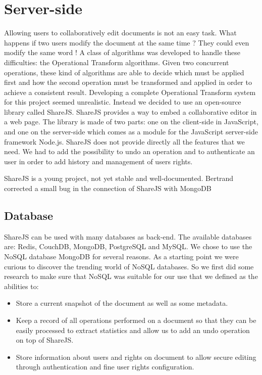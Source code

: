 \documentclass{llncs}
\begin{document}
\section{Server-side}\label{sec:Server-side}

Allowing users to collaboratively edit documents is not an easy task.
What happens if two users modify the document at the same time ?
They could even modify the same word ! A class of algorithms was developed to handle these difficulties:
the Operational Transform algorithms. Given two concurrent operations, these kind
of algorithms are able to decide which must be applied first and how the second
operation must be transformed and applied in order to achieve a consistent result.
Developing a complete Operational Transform system for this project seemed unrealistic.
Instead we decided to use an open-source library called ShareJS. 
ShareJS provides a way to embed a collaborative editor in a web page.
The library is made of two parts: one on the client-side in JavaScript, 
and one on the server-side which comes as a module for the JavaScript server-side framework
Node.js.
ShareJS does not provide directly all the features that we need. 
We had to add the possibility to undo an operation and to authenticate an user in order to add
history and management of users rights.

ShareJS is a young project, not yet stable and well-documented.
Bertrand corrected a small bug in the connection of ShareJS with MongoDB

\subsection{Database}
ShareJS can be used with many databases as back-end. 
The available databases are: Redis, CouchDB, MongoDB, PostgreSQL and MySQL.
We chose to use the NoSQL database MongoDB for several reasons. As a starting
point we were curious to discover the trending world of NoSQL databases. So we
first did some research to make sure that NoSQL was suitable for our use that we
defined as the abilities to:

\begin{itemize}
        \item Store a current snapshot of the document as well as some metadata.
        \item Keep a record of all operations performed on a document so that
            they can be easily processed to extract statistics and allow us to
            add an undo operation on top of ShareJS.
        \item Store information about users and rights on document to allow
            secure editing through authentication and fine user rights
            configuration.
\end{itemize}
\end{document}
